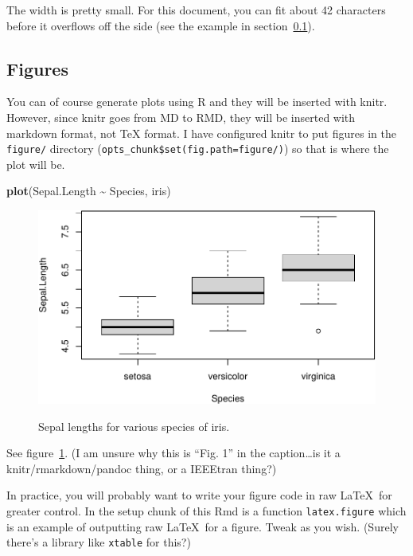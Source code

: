 \documentclass[a4paper,conference]{IEEEtran}
\makeatletter
\newenvironment{Shaded}{\begin{snugshade}}{\end{snugshade}}
\newcommand{\FunctionTok}[1]{\textcolor[rgb]{0.13,0.29,0.53}{\textbf{#1}}}
\newcommand{\NormalTok}[1]{#1}
\newcommand{\SpecialCharTok}[1]{\textcolor[rgb]{0.81,0.36,0.00}{\textbf{#1}}}
\def\maxwidth{\ifdim\Gin@nat@width>\linewidth\linewidth\else\Gin@nat@width\fi}
\def\maxheight{\ifdim\Gin@nat@height>\textheight\textheight\else\Gin@nat@height\fi}
\def\maxwidth{\ifdim\Gin@nat@width>\linewidth\linewidth\else\Gin@nat@width\fi}
\def\maxheight{\ifdim\Gin@nat@height>\textheight\textheight\else\Gin@nat@height\fi}
\def\pandocbounded#1{%
  \begin{adjustbox}{width=\maxwidth,height=\maxheight,keepaspectratio}#1\end{adjustbox}}
\makeatother
\begin{document}
The width is pretty small. For this document, you can fit about 42
characters before it overflows off the side (see the example in
section~\ref{sec:figures}).

\subsection{Figures}\label{sec:figures}

You can of course generate plots using R and they will be inserted with
knitr. However, since knitr goes from MD to RMD, they will be inserted
with markdown format, not TeX format. I have configured knitr to put
figures in the \texttt{figure/} directory
(\texttt{opts\_chunk\$set(fig.path=\textquotesingle{}figure/\textquotesingle{})})
so that is where the plot will be.

\begin{Shaded}
\begin{Highlighting}[]
\FunctionTok{plot}\NormalTok{(Sepal.Length }\SpecialCharTok{\textasciitilde{}}\NormalTok{ Species, iris)}
\end{Highlighting}
\end{Shaded}

\begin{figure}
\centering
\pandocbounded{\includegraphics[keepaspectratio,alt={Sepal lengths for various species of iris.}]{figure/iris.plot-1.pdf}}
\caption{Sepal lengths for various species of iris.\label{fig:iris}}
\end{figure}

See figure~\ref{fig:iris}. (I am unsure why this is ``Fig. 1'' in the
caption\ldots is it a knitr/rmarkdown/pandoc thing, or a IEEEtran
thing?)

In practice, you will probably want to write your figure code in raw
\LaTeX~for greater control. In the setup chunk of this Rmd is a function
\texttt{latex.figure} which is an example of outputting raw \LaTeX~for a
figure. Tweak as you wish. (Surely there's a library like
\texttt{xtable} for this?)
\end{document}
